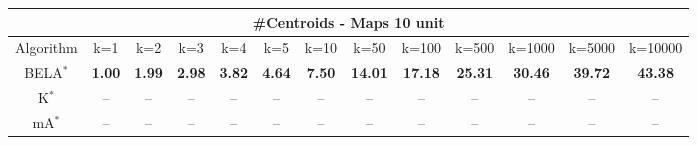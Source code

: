 \begin{tabular}{c|cccccccccccc}\toprule
\multicolumn{13}{c}{#Centroids - Maps 10 unit}\\ \midrule
Algorithm & k=1 & k=2 & k=3 & k=4 & k=5 & k=10 & k=50 & k=100 & k=500 & k=1000 & k=5000 & k=10000 \\ \midrule
BELA$^*$ & \textbf{1.00} & \textbf{1.99} & \textbf{2.98} & \textbf{3.82} & \textbf{4.64} & \textbf{7.50} & \textbf{14.01} & \textbf{17.18} & \textbf{25.31} & \textbf{30.46} & \textbf{39.72} & \textbf{43.38} \\
K$^*$ & -- & -- & -- & -- & -- & -- & -- & -- & -- & -- & -- & -- \\
mA$^*$ & -- & -- & -- & -- & -- & -- & -- & -- & -- & -- & -- & -- \\ \bottomrule 
\end{tabular}
